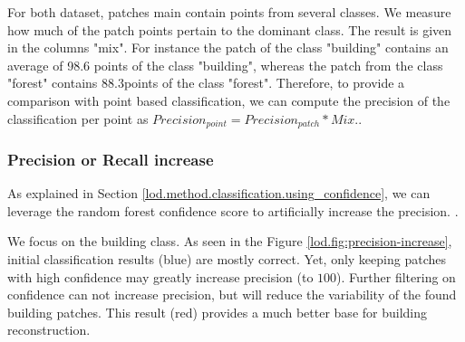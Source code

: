 		For both dataset, patches main contain points from several classes. We measure how much of the patch points pertain to the dominant class. The result is given in the columns "mix". For instance the patch of the class "building" contains an average of 98.6 \mypercent points of the class "building", whereas the patch from the class "forest" contains 88.3\mypercent points of the class "forest".
		Therefore, to provide a comparison with point based classification, we can compute the precision of the classification per point as $Precision_{point} = Precision_{patch} * Mix.$.
		
		\subsubsection{Precision or Recall increase} 
		
		As explained in Section \ref{lod.method.classification.using_confidence}, we can leverage the random forest confidence score to artificially increase the precision.
		.
		
		We focus on the building class.
		As seen in the Figure \ref{lod.fig:precision-increase}, initial classification results (blue) are mostly correct.
		Yet, only keeping patches with high confidence may greatly increase precision (to $100$\mypercent).
		Further filtering on confidence can not increase precision, but will reduce the variability of the found building patches. 
		This result (red) provides a much better base for building reconstruction. 
				

